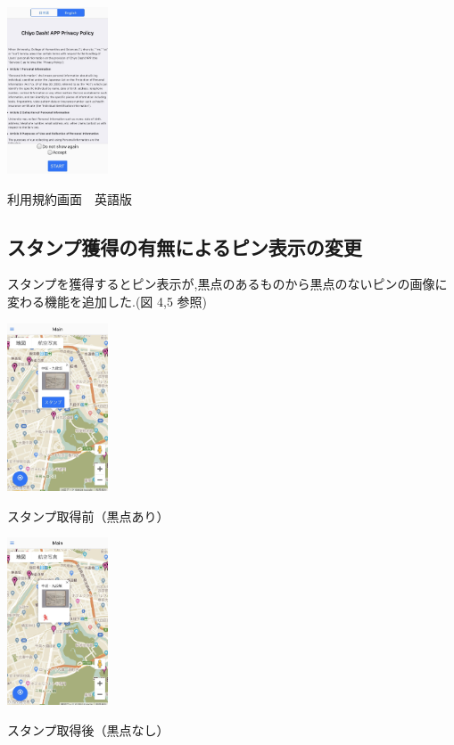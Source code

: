 \documentclass[a4paper, twoside]{jarticle}
\makeatletter
\newenvironment{figurehere}
  {\def\@captype{figure}}
  {}
\makeatother
\begin{document}
\begin{multicols}{2}
\begin{figurehere}
\begin{center}
\includegraphics[bb=30 50 550 1300,width=3cm]{./image03.jpg}%
\end{center}
\caption{利用規約画面　英語版}\label{fig:3}
\end{figurehere}


\subsection{スタンプ獲得の有無によるピン表示の変更}
スタンプを獲得するとピン表示が,黒点のあるものから黒点のないピンの画像に変わる機能を追加した.(図 4,5 参照)
\begin{figurehere}
\begin{center}
\includegraphics[bb=30 50 550 1300,width=3cm]{./image05.jpg}%
\end{center}
\caption{スタンプ取得前（黒点あり）}\label{fig:4}

\begin{center}
\includegraphics[bb=30 50 550 1300,width=3cm]{./image06.jpg}%
\end{center}
\caption{スタンプ取得後（黒点なし）}\label{fig:5}
\end{figurehere}


\end{multicols}
\end{document}
